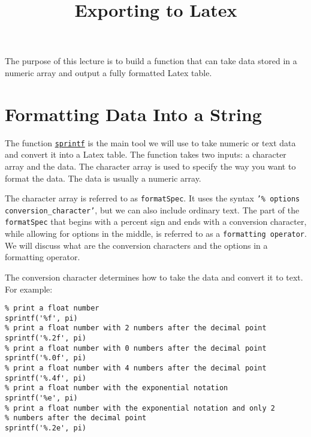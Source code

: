 \documentclass[12pt, a4paper]{article}
\date{}
\title{Exporting to Latex}
\begin{document}
\maketitle
The purpose of this lecture is to build a function that can take data stored in a numeric array and output a fully formatted Latex table.
\section{Formatting Data Into a String}
\label{sec:org6c51e36}
The function \href{https://www.mathworks.com/help/matlab/ref/sprintf.html}{\texttt{sprintf}} is the main tool we will use to take numeric or text data and convert it into a Latex table.
The function takes two inputs: a character array and the data.
The character array is used to specify the way you want to format the data.
The data is usually a numeric array.

The character array is referred to as \texttt{formatSpec}.
It uses the syntax \texttt{'\% options conversion\_character'}, but we can also include ordinary text.
The part of the \texttt{formatSpec} that begins with a percent sign and ends with a conversion character, while allowing for options in the middle, is referred to as a \texttt{formatting operator}.
We will discuss what are the conversion characters and the options in a formatting operator.

The conversion character determines how to take the data and convert it to text.
For example:
\lstset{language=matlab,label= ,caption= ,captionpos=b,firstnumber=1,numbers=left,style=Matlab-editor}
\begin{lstlisting}
% print a float number
sprintf('%f', pi)
% print a float number with 2 numbers after the decimal point
sprintf('%.2f', pi)
% print a float number with 0 numbers after the decimal point
sprintf('%.0f', pi)
% print a float number with 4 numbers after the decimal point
sprintf('%.4f', pi)
% print a float number with the exponential notation
sprintf('%e', pi)
% print a float number with the exponential notation and only 2
% numbers after the decimal point
sprintf('%.2e', pi)
\end{lstlisting}
\end{document}
